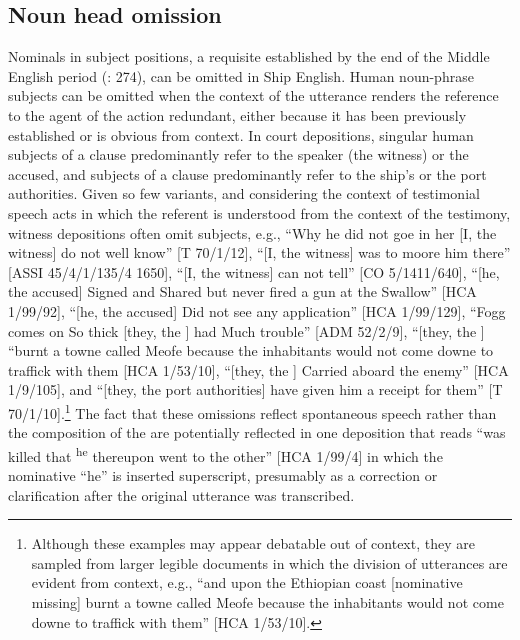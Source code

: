 \subsection{{Noun head omission} }\label{sec:5.2.4}

Nominals in subject positions, a requisite established by the end of the Middle English period (\citealt{MillwardHayes2012}: 274), can be omitted in Ship English. Human noun-phrase subjects can be omitted when the context of the utterance renders the reference to the agent of the action redundant, either because it has been previously established or is obvious from context. In court depositions, singular human subjects of a clause predominantly refer to the speaker (the witness) or the accused, and  subjects of a clause predominantly refer to the ship’s  or the port authorities. Given so few variants, and considering the context of testimonial speech acts in which the referent is understood from the context of the testimony, witness depositions often omit  subjects, e.g., “Why he did not goe in her [I, the witness] do not well know” [T 70/1/12], “[I, the witness] was to moore him there” [ASSI 45/4/1/135/4 1650], “[I, the witness] can not tell” [CO 5/1411/640], “[he, the accused] Signed and Shared but never fired a gun at the Swallow” [HCA 1/99/92], “[he, the accused] Did not see any application” [HCA 1/99/129], “Fogg comes on So thick [they, the ] had Much trouble” [ADM 52/2/9], “[they, the ] “burnt a towne called Meofe because the inhabitants would not come downe to traffick with them [HCA 1/53/10], “[they, the ] Carried aboard the enemy” [HCA 1/9/105], and “[they, the port authorities] have given him a receipt for them” [T 70/1/10].\footnote{Although these examples may appear debatable out of context, they are sampled from larger legible documents in which the division of utterances are evident from context, e.g., “and upon the Ethiopian coast [nominative missing] burnt a towne called Meofe because the inhabitants would not come downe to traffick with them” [HCA 1/53/10].} The fact that these omissions reflect spontaneous speech rather than the composition of the  are potentially reflected in one deposition that reads “was killed that \textsuperscript{he} thereupon went to the other” [HCA 1/99/4] in which the nominative  “he” is inserted superscript, presumably as a correction or clarification after the original utterance was transcribed. 

